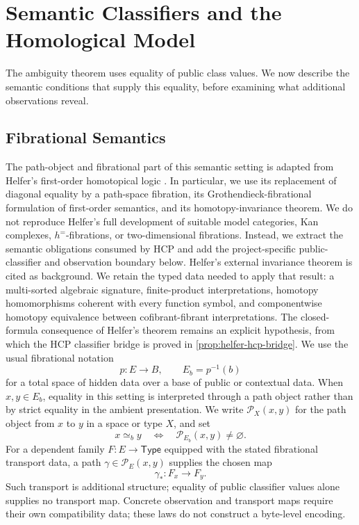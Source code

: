 \section{Semantic Classifiers and the Homological Model}\label{sec:mathematical-framework}

The ambiguity theorem uses equality of public class values. We now describe
the semantic conditions that supply this equality, before examining what
additional observations reveal.

\subsection{Fibrational Semantics}

The path-object and fibrational part of this semantic setting is adapted from
Helfer's first-order homotopical logic
\cite[Sections~2--7]{helfer2019fol}. In particular, we use its replacement of
diagonal equality by a path-space fibration, its Grothendieck-fibrational
formulation of first-order semantics, and its homotopy-invariance theorem.
We do not reproduce Helfer's full development of suitable model categories,
Kan complexes, \(h^{=}\)-fibrations, or two-dimensional fibrations. Instead, we
extract the semantic obligations consumed by HCP and add the project-specific
public-classifier and observation boundary below. Helfer's external invariance
theorem is cited as background. We retain the typed data needed to apply
that result: a
multi-sorted algebraic signature, finite-product interpretations, homotopy
homomorphisms coherent with every function symbol, and componentwise
homotopy equivalence between cofibrant-fibrant interpretations. The
closed-formula consequence of Helfer's theorem remains an explicit hypothesis,
from which the HCP classifier bridge is proved in
\cref{prop:helfer-hcp-bridge}.
We use the usual fibrational notation
\[
  p:E\longrightarrow B,
  \qquad
  E_b=p^{-1}(b)
\]
for a total space of hidden data over a base of public or contextual data.
When \(x,y\in E_b\), equality in this setting is interpreted through a
path object rather than by strict equality in the ambient presentation. We
write \(\mathcal P_X(x,y)\) for the path object from \(x\) to \(y\) in a space
or type \(X\), and set
\[
  x\simeq_b y
  \quad\Longleftrightarrow\quad
  \mathcal P_{E_b}(x,y)\neq\varnothing .
\]
For a dependent family \(F:E\to\mathsf{Type}\) equipped with the stated
fibrational transport data, a path \(\gamma\in\mathcal P_E(x,y)\) supplies the chosen map
\[
  \gamma_{\ast}:F_x\longrightarrow F_y.
\]
Such transport is additional structure; equality of public classifier values
alone supplies no transport map.
Concrete observation and transport maps require their own compatibility
data; these laws do not construct a byte-level encoding.

